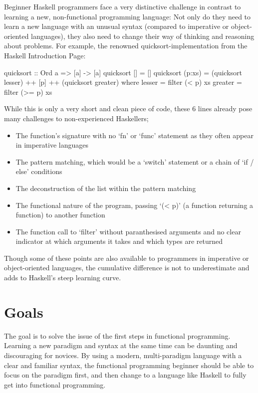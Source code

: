 Beginner Haskell programmers face a very distinctive challenge in contrast to learning a new, non-functional programming language:
Not only do they need to learn a new language with an unusual syntax (compared to imperative or object-oriented languages), they
also need to change their way of thinking and reasoning about problems.
For example, the renowned quicksort-implementation from the Haskell Introduction Page\autocite{haskell-quicksort}:

\begin{haskellcode}
quicksort :: Ord a => [a] -> [a]
quicksort []     = []
quicksort (p:xs) = (quicksort lesser) ++ [p] ++ (quicksort greater)
    where
        lesser  = filter (< p) xs
        greater = filter (>= p) xs
\end{haskellcode}

While this is only a very short and clean piece of code, these 6 lines already pose many challenges to non-experienced Haskellers;

\begin{itemize}
    \item The function's signature with no `fn' or `func' statement as they often appear in imperative languages
    \item The pattern matching, which would be a `switch' statement or a chain of `if / else' conditions
    \item The deconstruction of the list within the pattern matching
    \item The functional nature of the program, passing `(< p)' (a function returning a function) to another function
    \item The function call to `filter' without paranthesised arguments and no clear indicator at which arguments
        it takes and which types are returned
\end{itemize}

Though some of these points are also available to programmers in imperative or object-oriented languages, the cumulative difference
is not to underestimate and adds to Haskell's steep learning curve.


\section{Goals}


The goal is to solve the issue of the first steps in functional programming.
Learning a new paradigm and syntax at the same time can be daunting and discouraging for novices.
By using a modern, multi-paradigm language with a clear
and familiar syntax, the functional programming beginner should be able to focus on the paradigm
first, and then change to a language like Haskell to fully get into functional programming.

